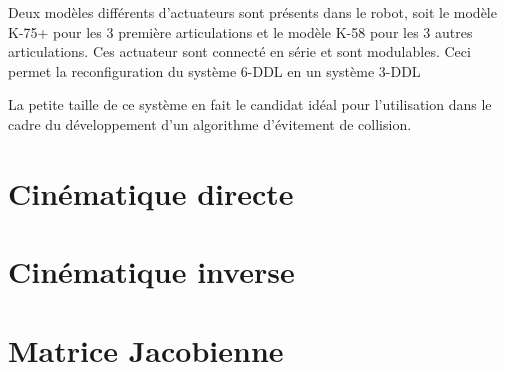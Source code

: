 Deux modèles différents d'actuateurs sont présents dans le robot, soit le modèle K-75+ pour les 3 première articulations et le modèle K-58 pour les 3 autres articulations.
Ces actuateur sont connecté en série et sont modulables. Ceci permet la reconfiguration du système 6-DDL en un système 3-DDL




La petite taille de ce système en fait le candidat idéal pour l'utilisation dans le cadre du développement d'un algorithme d'évitement de collision.





\section{Cinématique directe}
\section{Cinématique inverse}
\section{Matrice Jacobienne}
